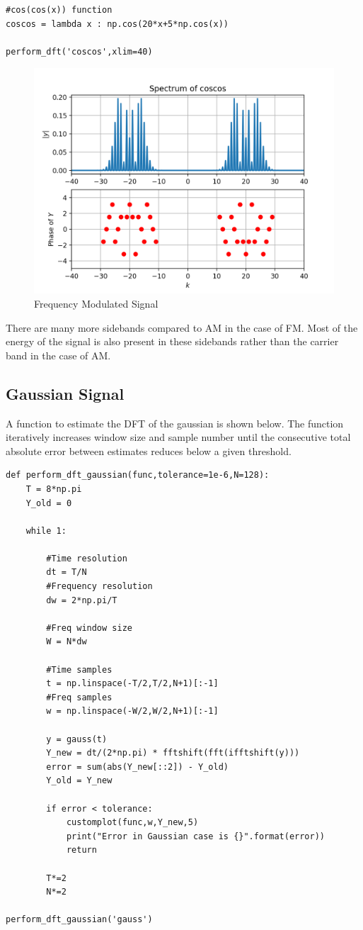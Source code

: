 \documentclass[11pt, a4paper]{article}
\begin{document}
\begin{lstlisting}
#cos(cos(x)) function 
coscos = lambda x : np.cos(20*x+5*np.cos(x))

perform_dft('coscos',xlim=40)
\end{lstlisting}

\begin{figure}[!tbh]
   	\centering
   	\includegraphics[scale=0.7]{FM.png}   
   	\caption{Frequency Modulated Signal}
   	\label{fig:Figure_1}
\end{figure}
There are many more sidebands compared to AM in the case of FM. Most of the energy of the signal is also present in these sidebands rather than the carrier band in the case of AM.

\subsection{Gaussian Signal}
A function to estimate the DFT of the gaussian is shown below. The function iteratively increases window size and sample number until the consecutive total absolute error between estimates reduces below a given threshold.
\begin{lstlisting}
def perform_dft_gaussian(func,tolerance=1e-6,N=128):
	T = 8*np.pi
	Y_old = 0

	while 1:

		#Time resolution
		dt = T/N
		#Frequency resolution
		dw = 2*np.pi/T

		#Freq window size
		W = N*dw

		#Time samples
		t = np.linspace(-T/2,T/2,N+1)[:-1]
		#Freq samples
		w = np.linspace(-W/2,W/2,N+1)[:-1]

		y = gauss(t)
		Y_new = dt/(2*np.pi) * fftshift(fft(ifftshift(y)))
		error = sum(abs(Y_new[::2]) - Y_old)
		Y_old = Y_new

		if error < tolerance:
			customplot(func,w,Y_new,5)
			print("Error in Gaussian case is {}".format(error))
			return

		T*=2
		N*=2

perform_dft_gaussian('gauss')
\end{lstlisting}
\end{document}
